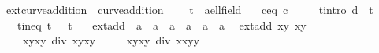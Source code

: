 \begin{isabellebody}
\isanewline
\isanewline
{}\isamarkupfalse%
%
\endisatagproof
{\isafoldproof}%
%
\isadelimproof
\isanewline
%
\endisadelimproof
\isanewline
{}\isamarkupfalse%
%
\isadelimdocument
%
\endisadelimdocument
%
\isatagdocument
%
\isamarkuptrue%
%
\endisatagdocument
{\isafolddocument}%
%
\isadelimdocument
%
\endisadelimdocument
{}\isamarkupfalse%
\ ext{\isacharunderscore}curve{\isacharunderscore}addition\ {\isacharequal}\ curve{\isacharunderscore}addition\ {\isacharplus}\isanewline
\ \ \ t{\isacharprime}\ {\isacharcolon}{\isacharcolon}\ {\isachardoublequoteopen}{\isacharprime}a{\isacharcolon}{\isacharcolon}ell{\isacharunderscore}field{\isachardoublequoteclose}\isanewline
\ \ \ c{\isacharunderscore}eq{\isacharunderscore}{}{\isacharcolon}\ {\isachardoublequoteopen}c\ {\isacharequal}\ {}{\isachardoublequoteclose}\isanewline
\ \ \ t{\isacharunderscore}intro{\isacharcolon}\ {\isachardoublequoteopen}d\ {\isacharequal}\ t{\isacharprime}{\isacharcircum}{}{\isachardoublequoteclose}\isanewline
\ \ \ t{\isacharunderscore}ineq{\isacharcolon}\ {\isachardoublequoteopen}t{\isacharprime}{\isacharcircum}{}\ {\isasymnoteq}\ {}{\isachardoublequoteclose}\ {\isachardoublequoteopen}t{\isacharprime}\ {\isasymnoteq}\ {}{\isachardoublequoteclose}\isanewline
{}\isanewline
\isanewline
{}\isamarkupfalse%
\ ext{\isacharunderscore}add\ {\isacharcolon}{\isacharcolon}\ {\isachardoublequoteopen}{\isacharprime}a\ {\isasymtimes}\ {\isacharprime}a\ {\isasymRightarrow}\ {\isacharprime}a\ {\isasymtimes}\ {\isacharprime}a\ {\isasymRightarrow}\ {\isacharprime}a\ {\isasymtimes}\ {\isacharprime}a{\isachardoublequoteclose}\ \isanewline
\ {\isachardoublequoteopen}ext{\isacharunderscore}add\ {\isacharparenleft}x{}{\isacharcomma}y{}{\isacharparenright}\ {\isacharparenleft}x{}{\isacharcomma}y{}{\isacharparenright}\ {\isacharequal}\isanewline
\ \ \ \ {\isacharparenleft}{\isacharparenleft}x{}{\isacharasterisk}y{}{\isacharminus}x{}{\isacharasterisk}y{}{\isacharparenright}\ div\ {\isacharparenleft}x{}{\isacharasterisk}y{}{\isacharminus}x{}{\isacharasterisk}y{}{\isacharparenright}{\isacharcomma}\isanewline
\ \ \ \ \ {\isacharparenleft}x{}{\isacharasterisk}y{}{\isacharplus}x{}{\isacharasterisk}y{}{\isacharparenright}\ div\ {\isacharparenleft}x{}{\isacharasterisk}x{}{\isacharplus}y{}{\isacharasterisk}y{}{\isacharparenright}{\isacharparenright}{\isachardoublequoteclose}\isanewline

\end{isabellebody}
